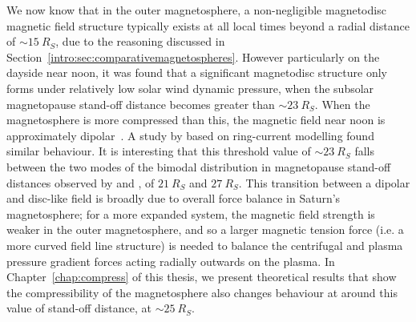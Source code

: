 We now know that in the outer magnetosphere, a non-negligible magnetodisc magnetic field structure typically exists at all local times beyond a radial distance of ${\sim}\SI{15}{R_S}$, due to the reasoning discussed in Section~\ref{intro:sec:comparativemagnetospheres}. However particularly on the dayside near noon, it was found that a significant magnetodisc structure only forms under relatively low solar wind dynamic pressure, when the subsolar magnetopause stand-off distance becomes greater than ${\sim}\SI{23}{R_S}$. When the magnetosphere is more compressed than this, the magnetic field near noon is approximately dipolar~\citep{arridge2008}. A study by \citet{bunce2008} based on ring-current modelling found similar behaviour. It is interesting that this threshold value of ${\sim}\SI{23}{R_S}$ falls between the two modes of the bimodal distribution in magnetopause stand-off distances observed by \citet{achilleos2008} and \citet{pilkington2015}, of $\SI{21}{R_S}$ and $\SI{27}{R_S}$. This transition between a dipolar and disc-like field is broadly due to overall force balance in Saturn's magnetosphere; for a more expanded system, the magnetic field strength is weaker in the outer magnetosphere, and so a larger magnetic tension force (i.e. a more curved field line structure) is needed to balance the centrifugal and plasma pressure gradient forces acting radially outwards on the plasma. In Chapter~\ref{chap:compress} of this thesis, we present theoretical results that show the compressibility of the magnetosphere also changes behaviour at around this value of stand-off distance, at ${\sim}\SI{25}{R_S}$. 

